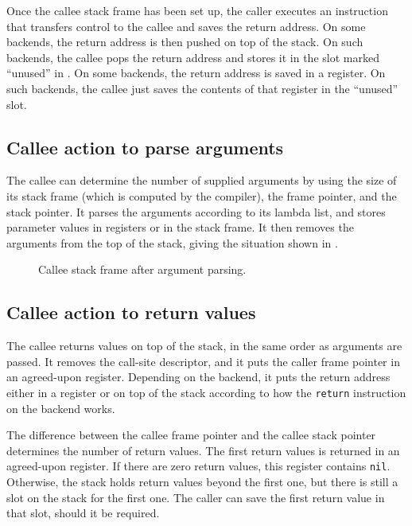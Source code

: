 Once the callee stack frame has been set up, the caller
executes an instruction that transfers control to the callee and saves
the return address.  On some backends, the return address is then
pushed on top of the stack.  On such backends, the callee pops the
return address and stores it in the slot marked ``unused'' in
.  On some backends, the return
address is saved in a register.  On such backends, the callee just
saves the contents of that register in the ``unused'' slot.

\subsection{Callee action to parse arguments}

The callee can determine the number of supplied arguments by using the
size of its stack frame (which is computed by the compiler), the frame
pointer, and the stack pointer.  It parses the arguments according to
its lambda list, and stores parameter values in registers or in the
stack frame.  It then removes the arguments from the top of the stack,
giving the situation shown in
.

\begin{figure}
\begin{center}
\end{center}
\caption{\label{fig-callee-stack-frame-after-argument-parsing}
Callee stack frame after argument parsing.}
\end{figure}

\subsection{Callee action to return values}

The callee returns values on top of the stack, in the same order as
arguments are passed.  It removes the call-site descriptor, and it
puts the caller frame pointer in an agreed-upon register.  Depending
on the backend, it puts the return address either in a register or on
top of the stack according to how the \texttt{return} instruction on
the backend works.

The difference between the callee frame pointer and the callee stack
pointer determines the number of return values.  The first return
values is returned in an agreed-upon register.  If there are zero
return values, this register contains \texttt{nil}.  Otherwise, the
stack holds return values beyond the first one, but there is still a
slot on the stack for the first one.  The caller can save the first
return value in that slot, should it be required.

